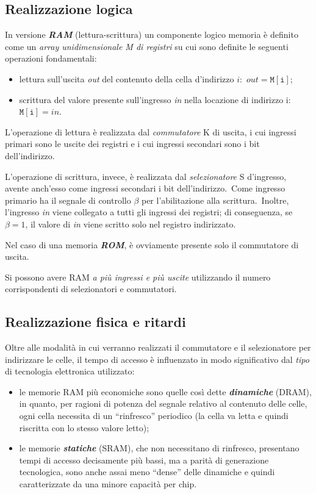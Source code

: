 \subsection{Realizzazione logica}

In versione \textbf{\textit{RAM}} (lettura-scrittura) un componente logico memoria è definito come un \textit{array unidimensionale M di registri} su cui sono definite le seguenti operazioni fondamentali:

\begin{itemize}
    \item lettura sull'uscita \textit{out} del contenuto della cella d'indirizzo $i$:\ $\mathit{out} = \mathtt{M[i]}$;
    \item scrittura del valore presente sull'ingresso \textit{in} nella locazione di indirizzo i:\ $\mathtt{M[i]} = \mathit{in}$.
\end{itemize}

\noindent L'operazione di lettura è realizzata dal \textit{commutatore} K di uscita, i cui ingressi primari sono le uscite dei registri e i cui ingressi secondari sono i bit dell'indirizzo.

L'operazione di scrittura, invece, è realizzata dal \textit{selezionatore} S d'ingresso, avente anch'esso come ingressi secondari i bit dell'indirizzo.\
Come ingresso primario ha il segnale di controllo $\beta$ per l'abilitazione alla scrittura.\
Inoltre, l'ingresso \textit{in} viene collegato a tutti gli ingressi dei registri; di conseguenza, se $\beta = 1$, il valore di \textit{in} viene scritto solo nel registro indirizzato.

Nel caso di una memoria \textbf{\textit{ROM}}, è ovviamente presente solo il commutatore di uscita.

Si possono avere RAM \textit{a più ingressi e più uscite} utilizzando il numero corrispondenti di selezionatori e commutatori.

\subsection{Realizzazione fisica e ritardi}

Oltre alle modalità in cui verranno realizzati il commutatore e il selezionatore per indirizzare le celle, il tempo di accesso è influenzato in modo significativo dal \textit{tipo} di tecnologia elettronica utilizzato:

\begin{itemize}
    \item le memorie RAM più economiche sono quelle così dette \textbf{\textit{dinamiche}} (DRAM), in quanto, per ragioni di potenza del segnale relativo al contenuto delle celle, ogni cella necessita di un ``rinfresco'' periodico (la cella va letta e quindi riscritta con lo stesso valore letto);
    \item le memorie \textbf{\textit{statiche}} (SRAM), che non necessitano di rinfresco, presentano tempi di accesso decisamente più bassi, ma a parità di generazione tecnologica, sono anche assai meno ``dense'' delle dinamiche e quindi caratterizzate da una minore capacità per chip.
\end{itemize}

